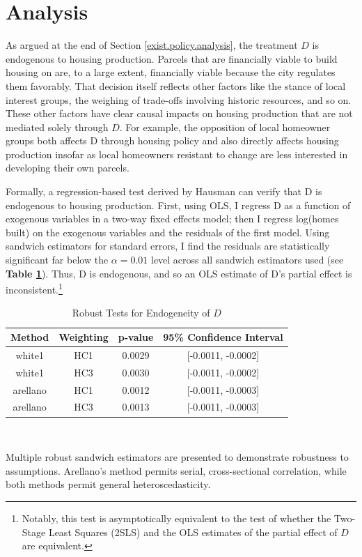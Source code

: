 \documentclass[a4paper,12pt]{article}
\begin{document}
\section{Analysis}
\label{analysis.sec}
As argued at the end of Section \ref{exist.policy.analysis}, the treatment $D$ is endogenous to housing production. Parcels that are financially viable to build housing on are, to a large extent, financially viable because the city regulates them favorably.\cite{monkkonen2016understanding} That decision itself reflects other factors like the stance of local interest groups, the weighing of trade-offs involving historic resources, and so on.\cite{dougherty2020golden} These other factors have clear causal impacts on housing production that are not mediated solely through $D$. For example, the opposition of local homeowner groups both affects D through housing policy and also directly affects housing production insofar as local homeowners resistant to change are less interested in developing their own parcels.

Formally, a regression-based test derived by Hausman can verify that D is endogenous to housing production.\cite{wooldridge2010econometric} First, using OLS, I regress D as a function of exogenous variables in a two-way fixed effects model; then I regress log(homes built) on the exogenous variables and the residuals of the first model. Using sandwich estimators for standard errors, I find the residuals are statistically significant far below the $\alpha=0.01$ level across all sandwich estimators used (see \textbf{Table \ref{hausman.endog.test}}). Thus, D is endogenous, and so an OLS estimate of D's partial effect is inconsistent.\footnote{Notably, this test is asymptotically equivalent to the test of whether the Two-Stage Least Squares (2SLS) and the OLS estimates of the partial effect of $D$ are equivalent.\cite{wooldridge2010econometric}}
\setlength{\tabcolsep}{10pt} 

\begin{table}[bth]
    \centering
    \caption{Robust Tests for Endogeneity of $D$}
    \begin{tabular}{|c|c|c|c|}
        \hline
        Method & Weighting & p-value & 95\% Confidence Interval \\
        \hline
        white1 & HC1 & 0.0029 & [-0.0011, -0.0002] \\
        white1 & HC3 & 0.0030 & [-0.0011, -0.0002] \\
        arellano & HC1 & 0.0012 & [-0.0011, -0.0003] \\
        arellano & HC3 & 0.0013 & [-0.0011, -0.0003] \\
        \hline
    \end{tabular}
    \label{hausman.endog.test} \\
    \raggedright
    \medskip
    \small{Multiple robust sandwich estimators are presented to demonstrate robustness to assumptions. Arellano's method permits serial, cross-sectional correlation, while both methods permit general heteroscedasticity.}
    \bottomrule
\end{table}
\end{document}

